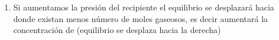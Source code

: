 \begin{exerciseEVAU}
\begin{solu}
\begin{enumerate}[label=\letraminuscula]
\begin{equation*}
    k_c =\dfrac{0.17^2}{0.03^2\cdot 0.115} = 279.23\ \si{\per\molar}
\end{equation*}
Ahora calculamos la \(k_p\) según la relación:
\begin{equation*}
    k_p = k_c\ (R\ T)^{\Delta n} = 5.88\cdot (0.082\cdot 1273)^{-1} = \SI{2.67}{\per\atmospher}
\end{equation*}
\item Si aumentamos la presión del recipiente el equilibrio se desplazará hacia donde existan menos número de moles gaseosos, es decir aumentará la concentración de  (equilibrio se desplaza hacia la derecha)
        \end{enumerate}
    \end{solu}

\end{exerciseEVAU}

